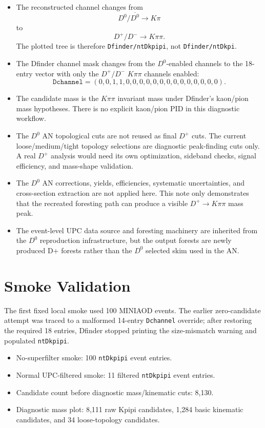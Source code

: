 \documentclass[10pt]{article}
\begin{document}
\begin{itemize}
\item The reconstructed channel changes from
\[
D^0/\overline{D^0}\to K\pi
\]
to
\[
D^+/D^-\to K\pi\pi .
\]
The plotted tree is therefore \texttt{Dfinder/ntDkpipi}, not
\texttt{Dfinder/ntDkpi}.
\item The Dfinder channel mask changes from the \(D^0\)-enabled channels to the
18-entry vector with only the \(D^+/D^-\) \(K\pi\pi\) channels enabled:
\[
\texttt{Dchannel} =
(0,0,1,1,0,0,0,0,0,0,0,0,0,0,0,0,0,0).
\]
\item The candidate mass is the \(K\pi\pi\) invariant mass under Dfinder's
kaon/pion mass hypotheses. There is no explicit kaon/pion PID in this
diagnostic workflow.
\item The \(D^0\) AN topological cuts are not reused as final \(D^+\) cuts.
The current loose/medium/tight topology selections are diagnostic peak-finding
cuts only. A real \(D^+\) analysis would need its own optimization, sideband
checks, signal efficiency, and mass-shape validation.
\item The \(D^0\) AN corrections, yields, efficiencies, systematic
uncertainties, and cross-section extraction are not applied here. This note
only demonstrates that the recreated foresting path can produce a visible
\(D^+ \to K\pi\pi\) mass peak.
\item The event-level UPC data source and foresting machinery are inherited
from the \(D^0\) reproduction infrastructure, but the output forests are newly
produced D+ forests rather than the \(D^0\) selected skim used in the AN.
\end{itemize}

\section*{Smoke Validation}

The first fixed local smoke used 100 MINIAOD events. The earlier zero-candidate
attempt was traced to a malformed 14-entry \texttt{Dchannel} override; after
restoring the required 18 entries, Dfinder stopped printing the size-mismatch
warning and populated \texttt{ntDkpipi}.

\begin{itemize}
\item No-superfilter smoke: 100 \texttt{ntDkpipi} event entries.
\item Normal UPC-filtered smoke: 11 filtered \texttt{ntDkpipi} event entries.
\item Candidate count before diagnostic mass/kinematic cuts: 8,130.
\item Diagnostic mass plot: 8,111 raw Kpipi candidates, 1,284 basic kinematic
candidates, and 34 loose-topology candidates.
\end{itemize}
\end{document}
